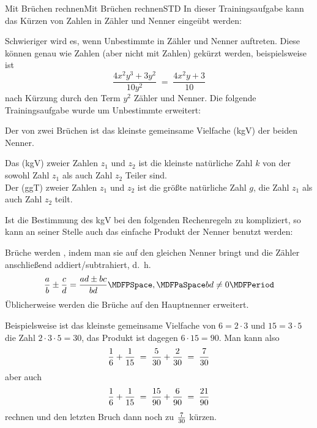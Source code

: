 \begin{MXContent}{Mit Brüchen rechnen}{Mit Brüchen rechnen}{STD}
In dieser Trainingsaufgabe kann das Kürzen von Zahlen in Zähler und Nenner eingeübt werden:


Schwieriger wird es, wenn Unbestimmte in Zähler und Nenner auftreten. Diese können genau wie Zahlen (aber nicht mit Zahlen) gekürzt werden, beispielsweise ist
$$
\frac{4x^2y^3+3y^2}{10y^2} \;=\; \frac{4x^2y+3}{10}
$$
nach Kürzung durch den Term $y^2$ Zähler und Nenner.
Die folgende Trainingsaufgabe wurde um Unbestimmte erweitert:


\begin{MInfo}
Der  von zwei Brüchen ist das kleinste gemeinsame Vielfache (kgV) der beiden Nenner.

Das  (kgV) zweier Zahlen $z_1$ und $z_2$ ist die kleinste natürliche Zahl $k$ von der sowohl Zahl $z_1$ als auch Zahl $z_2$ Teiler sind. \\%
Der  (ggT) zweier Zahlen $z_1$ und $z_2$ ist die größte natürliche Zahl $g$, die Zahl $z_1$ als auch Zahl $z_2$ teilt.%
\end{MInfo}

Ist die Bestimmung des kgV bei den folgenden Rechenregeln zu kompliziert, so kann an seiner Stelle auch das einfache Produkt der Nenner benutzt werden:


\begin{MInfo}
Brüche werden , indem man sie auf den gleichen Nenner bringt und die Zähler anschließend addiert/subtrahiert, d.~h.
$$\Mdfrac{a}{b} \pm \Mdfrac{c}{d} = \Mdfrac{a d\pm b c}{b d} \MDFPSpace, \MDFPaSpace b d\neq 0 \MDFPeriod$$
Üblicherweise werden die Brüche auf den Hauptnenner erweitert. 
\end{MInfo}

Beispielsweise ist das kleinste gemeinsame Vielfache von $6=2\cdot 3$ und $15=3\cdot 5$ die Zahl $2\cdot3\cdot 5=30$, das Produkt ist dagegen $6\cdot 15=90$. Man kann also
$$
\dfrac{1}{6}+\dfrac{1}{15} \;=\; \dfrac{5}{30}+\dfrac{2}{30} \;=\; \dfrac{7}{30}
$$
aber auch
$$
\dfrac{1}{6}+\dfrac{1}{15} \;=\; \dfrac{15}{90}+\dfrac{6}{90} \;=\; \dfrac{21}{90}
$$
rechnen und den letzten Bruch dann noch zu $\tfrac{7}{30}$ kürzen.


\end{MXContent}
